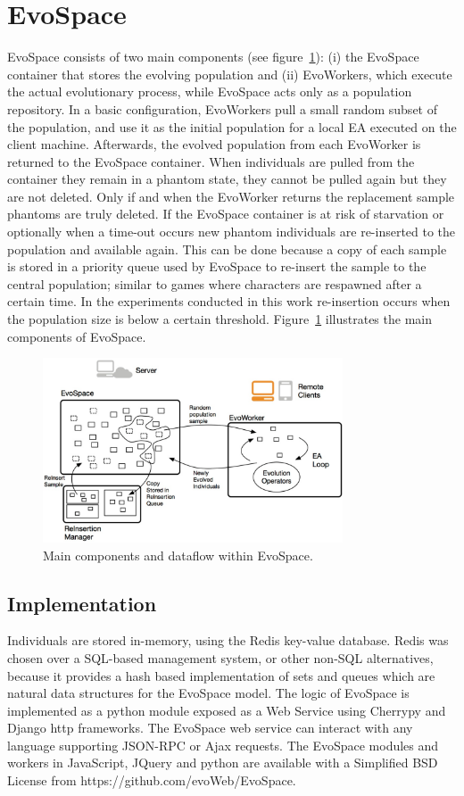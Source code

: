 \documentclass{llncs}
\begin{document}
\section{EvoSpace}
\label{sec:evo}
EvoSpace consists of two main components (see figure~\ref{fig:evo}): (i) the EvoSpace container that stores the evolving population and (ii) EvoWorkers, which execute the actual evolutionary process, while EvoSpace acts only as a population repository.
In a basic configuration, EvoWorkers pull a small random subset of the population, and use it as the initial population for a local EA executed on the client machine. Afterwards, the evolved population from each EvoWorker is returned to the EvoSpace container. When individuals are pulled from the container they remain in a phantom state, they cannot be pulled again but they are not deleted. Only if and when the EvoWorker returns the replacement sample phantoms are truly deleted. If the EvoSpace container is at risk of starvation or optionally when a time-out occurs new phantom individuals are re-inserted to the population and available again. This can be done because a copy of each sample is stored in a priority queue used by EvoSpace to re-insert the sample to the central population; similar to games where characters are respawned after a certain time. In the experiments conducted in this work re-insertion occurs when the population size is below a certain threshold. Figure~\ref{fig:evo} illustrates the main components of EvoSpace.

\begin{figure}[!t]
    \centering
        \includegraphics[width=3.5in]{eps/evospaceExample.eps}
    \caption{Main components and dataflow within EvoSpace.}
    \label{fig:evo}
\end{figure}


\subsection{Implementation}
Individuals are stored in-memory, using the Redis key-value database.
Redis was chosen over a SQL-based management system, or other non-SQL alternatives, because it provides a hash based implementation of sets and queues which are natural data structures for the EvoSpace model. The logic of EvoSpace is implemented as a python module exposed as a Web Service using Cherrypy and Django http frameworks. The EvoSpace web service can interact with any language supporting JSON-RPC or Ajax requests. The EvoSpace modules and workers in JavaScript, JQuery and python are available with a Simplified BSD License from https://github.com/evoWeb/EvoSpace. 
\end{document}
